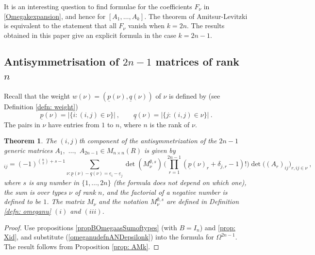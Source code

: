 \documentclass[10pt]{amsart}
\newcommand{\pp}{{\underline{p}}}
\newcommand{\qq}{{\underline{q}}}
\newcommand{\eee}{{\underline{e}}}
\theoremstyle{plain}
\newtheorem{thm}{Theorem}
\newcommand{\0}{\color{blue}{\mathsf{0}}}
\begin{document}
It is an interesting question to find formulae for the coefficients $F_{\nu}$ in \eqref{Omegakexpansion}, and hence for $[A_1,\ldots,A_k]$. The theorem of Amitsur-Levitzki is equivalent to the statement that all $F_{\nu}$ vanish when $k=2n$. 
The results obtained in this paper give an explicit formula in the case $k=2n-1.$

\subsection{Antisymmetrisation of \texorpdfstring{$2n-1$}{2n-1} matrices of rank \texorpdfstring{$n$}{n}} 
Recall that the weight $w(\nu)=(\pp(\nu),\qq(\nu))$ of $\nu$ is defined
by (see Definition \ref{defn: weight})
$$
\pp(\nu)=|\{i:(i,j)\in\nu\}|\ ,\qquad\qq(\nu)=|\{j:(i,j)\in\nu\}|\ .
$$
The pairs in $\nu$ have entries from $1$ to $n$,  where $n$ is the rank of $\nu$.
\begin{thm}
The $(i,j)$th component of the antisymmetrization of the $2n-1$ generic matrices $A_1,$ $\ldots,$ $A_{2n-1}\in M_{n\times n}(R)$
is given by
\begin{equation}
[A_1,\ldots,A_{2n-1}]_{ij}=(-1)^{\binom{n}{2}+s-1}\sum_{\nu:\pp(\nu)-\qq(\nu)=\eee_i-\eee_j}\det(M_{\nu}^{\emptyset,s})\,\Big(\prod_{r=1}^{2n-1}(\pp(\nu)_r+\delta_{j,r}-1)!\Big)\det \Big((A_r)_{ij}\Big)_{r,ij\in\nu}\ ,
\end{equation}
where $s$ is any number in $\{1,\ldots,2n\}$ (the formula does not depend on which one), the sum is over types $\nu$ of rank $n$, and the factorial of a negative number is defined to be $1$. 
The matrix $M_\nu$ and the notation  $M_{\nu}^{\emptyset,s}$   are defined in Definition \ref{defn: omeganu} $(i)$ and $(iii)$. 
\end{thm}

\begin{proof}
Use propositions \ref{propBOmegaasSumoftypes} (with $B=I_n$) and \ref{prop: Xid}, and substitute
(\ref{omeganudefnANDepsilonk}) into the formula for $\Omega^{2n-1}$. The result follows from Proposition \ref{prop: AMk}.
\end{proof}
\end{document}
